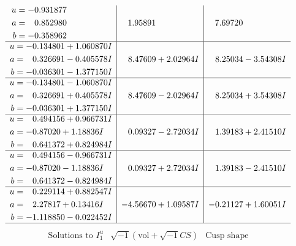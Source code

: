 \documentclass[1p]{elsarticle_modified}
\theoremstyle{definition}
\newcommand{\I}{\sqrt{-1}}
\begin{document}
$$\begin{array}{c|c|c}
\begin{aligned}
u &= -0.931877\phantom{ +0.000000I} \\
a &= \phantom{-}0.852980\phantom{ +0.000000I} \\
b &= -0.358962\phantom{ +0.000000I}\end{aligned}
 & \phantom{-}1.95891\phantom{ +0.000000I} & \phantom{-}7.69720\phantom{ +0.000000I} \\ \hline\begin{aligned}
u &= -0.134801 + 1.060870 I \\
a &= \phantom{-}0.326691 - 0.405578 I \\
b &= -0.036301 - 1.377150 I\end{aligned}
 & \phantom{-}8.47609 + 2.02964 I & \phantom{-}8.25034 - 3.54308 I \\ \hline\begin{aligned}
u &= -0.134801 - 1.060870 I \\
a &= \phantom{-}0.326691 + 0.405578 I \\
b &= -0.036301 + 1.377150 I\end{aligned}
 & \phantom{-}8.47609 - 2.02964 I & \phantom{-}8.25034 + 3.54308 I \\ \hline\begin{aligned}
u &= \phantom{-}0.494156 + 0.966731 I \\
a &= -0.87020 + 1.18836 I \\
b &= \phantom{-}0.641372 + 0.824984 I\end{aligned}
 & \phantom{-}0.09327 - 2.72034 I & \phantom{-}1.39183 + 2.41510 I \\ \hline\begin{aligned}
u &= \phantom{-}0.494156 - 0.966731 I \\
a &= -0.87020 - 1.18836 I \\
b &= \phantom{-}0.641372 - 0.824984 I\end{aligned}
 & \phantom{-}0.09327 + 2.72034 I & \phantom{-}1.39183 - 2.41510 I \\ \hline\begin{aligned}
u &= \phantom{-}0.229114 + 0.882547 I \\
a &= \phantom{-}2.27817 + 0.13416 I \\
b &= -1.118850 - 0.022452 I\end{aligned}
 & -4.56670 + 1.09587 I & -0.21127 + 1.60051 I\\
 \hline 
 \end{array}$$\newpage$$\begin{array}{c|c|c}  
\text{Solutions to }I^u_{1}& \I (\text{vol} + \sqrt{-1}CS) & \text{Cusp shape}\\

\end{array}$$
\end{document}
